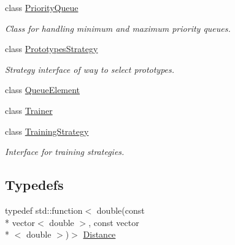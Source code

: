 \begin{DoxyCompactItemize}
class \hyperlink{classopf_1_1PriorityQueue}{Priority\+Queue}
\begin{DoxyCompactList}\small\item\em Class for handling minimum and maximum priority queues. \end{DoxyCompactList}\item 
class \hyperlink{classopf_1_1PrototypesStrategy}{Prototypes\+Strategy}
\begin{DoxyCompactList}\small\item\em Strategy interface of way to select prototypes. \end{DoxyCompactList}\item 
class \hyperlink{classopf_1_1QueueElement}{Queue\+Element}
\item 
class \hyperlink{classopf_1_1Trainer}{Trainer}
\item 
class \hyperlink{classopf_1_1TrainingStrategy}{Training\+Strategy}
\begin{DoxyCompactList}\small\item\em Interface for training strategies. \end{DoxyCompactList}\end{DoxyCompactItemize}
\subsection*{Typedefs}
\begin{DoxyCompactItemize}
\item 
typedef std\+::function$<$ double(const \\*
vector$<$ double $>$, const vector\\*
$<$ double $>$)$>$ \hyperlink{namespaceopf_a61631393754e0aa6aaeacf0767b2b419}{Distance}
\end{DoxyCompactItemize}
